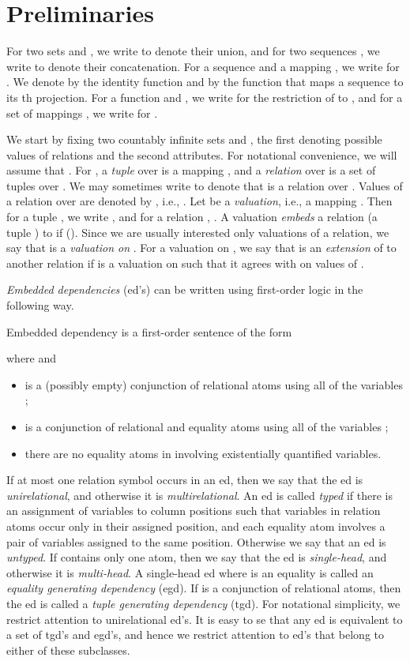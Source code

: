 \documentclass[envcountset]{llncs}
\begin{document}
\section{Preliminaries}
For two sets  and , we write  to denote their union, and for two sequences , we write  to denote their concatenation. For a sequence  and a mapping , we write  for . We denote by  the identity function and by  the function that maps a sequence to its th projection. 
For a function  and , we write  for the restriction of  to , and for a set of mappings , we write  for .

We start by fixing two countably infinite sets  and , the first denoting possible values of relations and the second  attributes. For notational convenience, we will assume that . For , a \emph{tuple} over  is a  mapping , and a \emph{relation} over  is a set of tuples over . We may sometimes write  to denote that  is a relation over . Values of a relation  over  are denoted by , i.e., . Let  be a \emph{valuation}, i.e., a mapping . Then for a tuple , we write , and for a relation , . A valuation  \emph{embeds}  a relation  (a tuple ) to  if  (). Since we are usually interested only valuations of a relation, we say that  is a \emph{valuation on }. For a valuation  on , we say that  is an \emph{extension} of  to another relation  if  is a valuation on  such that it agrees with  on values of .

\emph{Embedded dependencies} (ed's) can be written using first-order logic in the following way.
\begin{definition}
Embedded dependency is a first-order sentence of the form

where  and
\begin{itemize}
\item  is a (possibly empty) conjunction of relational atoms using all of the variables ;
\item  is a conjunction of relational and equality atoms using all of the variables ; 
\item there are no equality atoms in  involving existentially quantified variables.
\end{itemize}

\end{definition}
If at most one relation symbol occurs in an ed, then we say that the ed is \emph{unirelational}, and otherwise it is \emph{multirelational}. An ed is called \emph{typed} if there is an assignment of variables to column positions such that variables in relation atoms occur only in their assigned position, and each equality atom involves a pair of variables assigned to the same position. Otherwise we say that an ed is \emph{untyped}. If  contains only one atom, then we say that the ed is \emph{single-head}, and otherwise it is \emph{multi-head}.
A single-head ed where  is an equality is called an \emph{equality generating dependency} (egd). If  is a conjunction of relational atoms, then the ed is called a \emph{tuple generating dependency} (tgd). For notational simplicity, we restrict attention to unirelational ed's. It is easy to se that any ed is equivalent to a set of tgd's and egd's, and hence we restrict attention to ed's that belong to either of these subclasses. 
\end{document}
